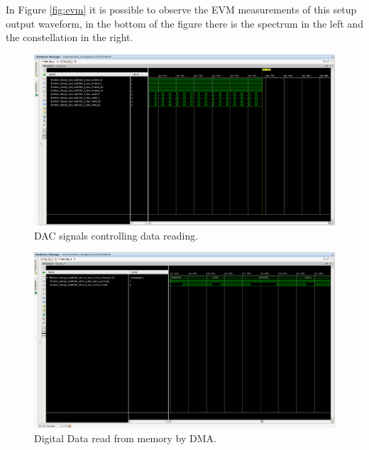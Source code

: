 In Figure \ref{fig:evm} it is possible to observe the EVM measurements of this
setup output waveform, in the bottom of the figure there is the spectrum in the
left and the constellation in the right.

\begin{figure}[htbp]
    \centering
    \includegraphics[width=1\textwidth,
    trim={{.15\textwidth} {1.2\textwidth} {.7\textwidth} {.16\textwidth}},
    clip]{./figures/dac_signals}
    \caption{ DAC signals controlling data reading.
    \label{fig:dacsignals}}
\end{figure}

\begin{figure}[htbp]
    \centering
    \includegraphics[width=1\textwidth,
    trim={{.15\textwidth} {1.3\textwidth} {.05\textwidth} {.16\textwidth}},
    clip]{./figures/ila_dataflow}
    \caption{ Digital Data read from memory by DMA.
    \label{fig:dataflowdig}}
\end{figure}

